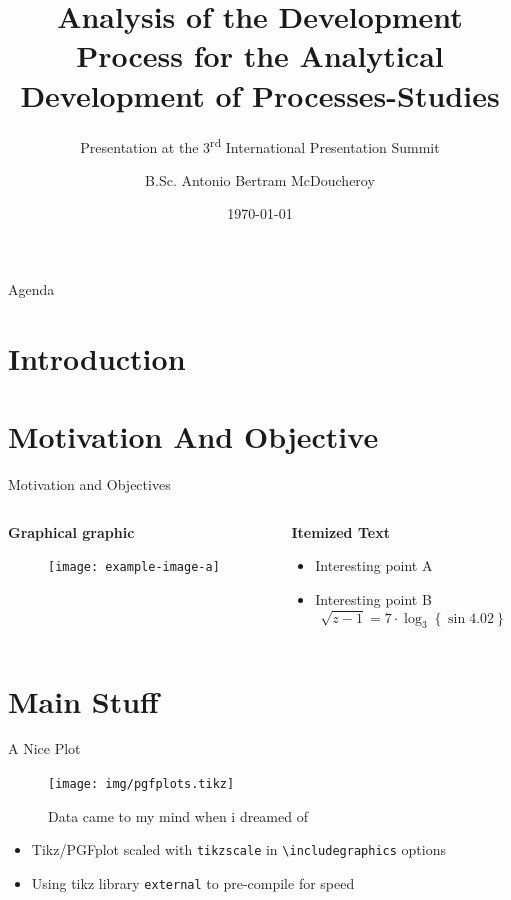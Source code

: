 \documentclass[en,navbaroff]{sdqbeamer} %
\title[Master Thesis]{Analysis of the Development Process for the Analytical Development of Processes-Studies}
\subtitle{Presentation at the 3\textsuperscript{rd} International Presentation Summit}
\author[Antonio B. McDoucheroy]{B.Sc. Antonio Bertram McDoucheroy}
\date[\today]{\today}
\begin{document}
\KITtitleframe
\begin{frame}[t]{Agenda}
\tableofcontents[hideallsubsections]
\end{frame}

\section{Introduction}

\section{Motivation And Objective}
\begin{frame}[t]{Motivation and Objectives}
\begin{columns}[T]
	\begin{column}{0.5\linewidth}
		\textbf{Graphical graphic}
		\begin{figure}
		\texttt{[image: example-image-a]}
		\end{figure}
	\end{column}
	\begin{column}{0.5\linewidth}
		\textbf{Itemized Text}
		\begin{itemize}
		\item<1-> Interesting point A
		\item<2-> Interesting point B
		\begin{equation*}
		\sqrt{z-1}=7 \cdot \log_3 \left\{\sin 4.02\right\}
		\end{equation*}
		\end{itemize}
	\end{column}
\end{columns}
\end{frame}

\section{Main Stuff}
\begin{frame}[t]{A Nice Plot}
\begin{figure}
\centering
\texttt{[image: img/pgfplots.tikz]}
\caption{Data came to my mind when i dreamed of \cite{journals/bstj/Shannon48}}
\end{figure}
\begin{itemize}
\item Tikz/PGFplot scaled with \texttt{tikzscale} in \texttt{\textbackslash includegraphics} options
\item Using tikz library \texttt{external} to pre-compile for speed
\end{itemize}
\end{frame}
\end{document}
